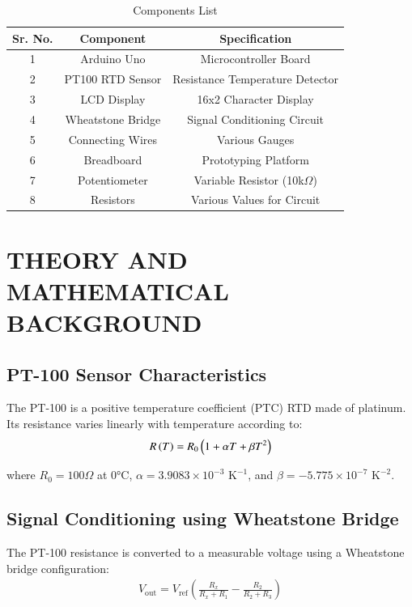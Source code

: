 \documentclass[journal]{IEEEtran}
\begin{document}
\begin{table}[H]
\centering
\begin{tabular}{|c|c|c|}
\hline
\textbf{Sr. No.} & \textbf{Component} & \textbf{Specification} \\
\hline
1 & Arduino Uno & Microcontroller Board \\
2 & PT100 RTD Sensor & Resistance Temperature Detector \\
3 & LCD Display & 16x2 Character Display \\
4 & Wheatstone Bridge & Signal Conditioning Circuit \\
5 & Connecting Wires & Various Gauges \\
6 & Breadboard & Prototyping Platform \\
7 & Potentiometer & Variable Resistor (10k$\Omega$) \\
8 & Resistors & Various Values for Circuit \\
\hline
\end{tabular}
\caption{Components List}
\end{table}

\section{\textbf{THEORY AND MATHEMATICAL BACKGROUND}}

\subsection{\textbf{PT-100 Sensor Characteristics}}

The PT-100 is a positive temperature coefficient (PTC) RTD made of platinum. Its resistance varies linearly with temperature according to:
\begin{align}
R\left(T\right) = R_0\left(1 + \alpha T + \beta T^2\right)
\end{align}

where \(R_0 = 100\Omega\) at 0°C, \(\alpha = 3.9083 \times 10^{-3}\text{ K}^{-1}\), and \(\beta = -5.775 \times 10^{-7}\text{ K}^{-2}\).

\subsection{\textbf{Signal Conditioning using Wheatstone Bridge}}

The PT-100 resistance is converted to a measurable voltage using a Wheatstone bridge configuration:
\begin{align}
V_{\text{out}} = V_{\text{ref}} \left(\frac{R_x}{R_x + R_1} - \frac{R_2}{R_2 + R_3}\right)
\end{align}
\end{document}
